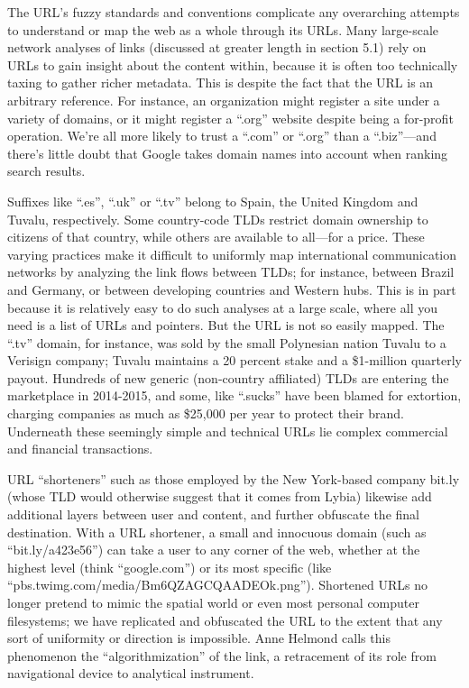 The URL's fuzzy standards and conventions complicate any overarching attempts to understand or map the web as a whole through its URLs. Many large-scale network analyses of links (discussed at greater length in section 5.1) rely on URLs to gain insight about the content within, because it is often too technically taxing to gather richer metadata. This is despite the fact that the URL is an arbitrary reference. For instance, an organization might register a site under a variety of domains, or it might register a ``.org'' website despite being a for-profit operation. We're all more likely to trust a ``.com'' or ``.org'' than a ``.biz''---and there's little doubt that Google takes domain names into account when ranking search results.\autocite[See][]{liversidge_whats_2012}

Suffixes like ``.es'', ``.uk'' or ``.tv'' belong to Spain, the United Kingdom and Tuvalu, respectively. Some country-code TLDs restrict domain ownership to citizens of that country, while others are available to all---for a price. These varying practices make it difficult to uniformly map international communication networks by analyzing the link flows between TLDs; for instance, between Brazil and Germany, or between developing countries and Western hubs.\autocites[See, e.g.,][]{chung_inferring_2013}{fragoso_understanding_2011}{himelboim_international_2010} This is in part because it is relatively easy to do such analyses at a large scale, where all you need is a list of URLs and pointers. But the URL is not so easily mapped. The ``.tv'' domain, for instance, was sold by the small Polynesian nation Tuvalu to a Verisign company; Tuvalu maintains a 20 percent stake and a \$1-million quarterly payout.\autocite{cave_i_2000} Hundreds of new generic (non-country affiliated) TLDs are entering the marketplace in 2014-2015, and some, like ``.sucks'' have been blamed for extortion, charging companies as much as \$25,000 per year to protect their brand.\autocite{noguchi_new_2015} Underneath these seemingly simple and technical URLs lie complex commercial and financial transactions.

URL ``shorteners'' such as those employed by the New York-based company bit.ly (whose TLD would otherwise suggest that it comes from Lybia) likewise add additional layers between user and content, and further obfuscate the final destination. With a URL shortener, a small and innocuous domain (such as ``bit.ly/a423e56'') can take a user to any corner of the web, whether at the highest level (think ``google.com'') or its most specific (like ``pbs.twimg.com/media/Bm6QZAGCQAADEOk.png''). Shortened URLs no longer pretend to mimic the spatial world or even most personal computer filesystems; we have replicated and obfuscated the URL to the extent that any sort of uniformity or direction is impossible. Anne Helmond calls this phenomenon the ``algorithmization'' of the link, a retracement of its role from navigational device to analytical instrument.\autocite{helmond_algorithmization_2013}

